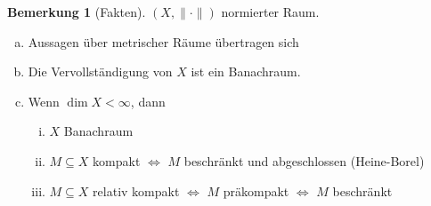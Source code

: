 \documentclass[ngerman]{report}
\theoremstyle{plain}%
\newtheorem{lemma}[thm]{Lemma}
\theoremstyle{definition}%
\theoremstyle{myStyle}
\newtheorem{bem}[thm]{Bemerkung}
\newcommand{\norm}[1]{\|#1\|}
\newcommand{\df}[1][]{%
	\overset{#1}{\Rightarrow}
}
\newcommand{\aq}{\Leftrightarrow} %
\begin{document}
	\begin{bem}[Fakten]
		$(X,\norm{\cdot})$ normierter Raum.
		\begin{enumerate}[a)]
			\item Aussagen über metrischer Räume übertragen sich
			\item Die Vervollständigung von $X$ ist ein Banachraum.
			\item Wenn $\dim X < \infty$, dann
				\begin{enumerate}[i)]
					\item $X$ Banachraum
					\item $M\subseteq X$ kompakt $\aq$ $M$ beschränkt und abgeschlossen (Heine-Borel)
					\item $M\subseteq X$ relativ kompakt $\aq$ $M$ präkompakt  $\aq$ $M$ beschränkt
				\end{enumerate}
		\end{enumerate}
	\end{bem}
\newcommand{\xt}{x_\eta}%


\end{document}
